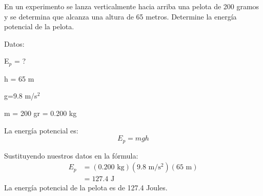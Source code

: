 \question[10] En un experimento se lanza verticalmente hacia arriba una pelota de 200 gramos y se determina que alcanza una altura de 65 metros. Determine la energía potencial de la pelota.

\begin{solutionbox}{5.5cm}
    \begin{multicols}{2}
        Datos:

        E$_p$ = ?

        h = 65 m

        g=9.8 m/s$^2$

        m = 200 gr = 0.200 kg

        La energía potencial es:
        \[E_p=mgh\]

        \vspace{2cm}

        Sustituyendo nuestros datos en la fórmula:
        \[
            \begin{array}{rl}
                E_p & = (0.200 \text{ kg})(9.8 \text{ m/s$^2$})(65 \text{ m}) \\[1em]
                    & =127.4 \text{ J }
            \end{array}
        \]
        La energía potencial de la pelota es de 127.4 Joules.
    \end{multicols}
\end{solutionbox}
